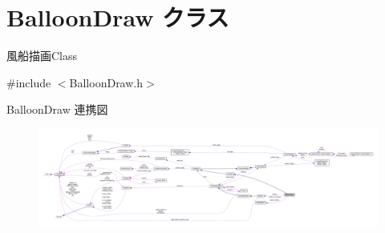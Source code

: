\hypertarget{class_balloon_draw}{}\section{Balloon\+Draw クラス}
\label{class_balloon_draw}


風船描画\+Class  




{\ttfamily \#include $<$Balloon\+Draw.\+h$>$}



Balloon\+Draw 連携図\nopagebreak
\begin{figure}[H]
\begin{center}
\leavevmode
\includegraphics[width=350pt]{class_balloon_draw__coll__graph}
\end{center}
\end{figure}

